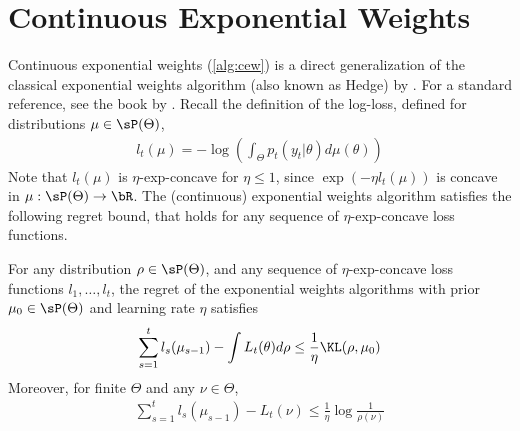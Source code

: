  
\section{Continuous Exponential Weights}\label{sec:cew}

Continuous exponential weights (\cref{alg:cew}) is a direct generalization of the classical exponential weights algorithm (also known as Hedge) by \cite{freund1997decision,littlestone1994weighted}. For a standard reference, see the book by \cite{cesa2006prediction}. Recall the definition of the log-loss, defined for distributions $\mu \in \sP(\Theta)$,
\begin{align*}
 l_t(\mu) = - \log \left(\int_{\Theta} p_t(y_t|\theta)d\mu(\theta)\right)
\end{align*}
Note that $l_t(\mu)$ is $\eta$-exp-concave for $\eta \leq 1$, since $\exp(-\eta l_t(\mu))$ is concave in $\mu : \sP(\Theta) \rightarrow \bR$. The (continuous) exponential weights algorithm satisfies the following regret bound, that holds for any sequence of $\eta$-exp-concave loss functions.
\begin{theorem}\label{thm:cew}
    For any distribution $\rho \in \sP(\Theta)$, and any sequence of $\eta$-exp-concave loss functions $l_1, \dots, l_t$, the regret of the exponential weights algorithms with prior $\mu_0 \in \sP(\Theta)$ and learning rate $\eta$ satisfies
    \begin{align*}
        \sum_{s=1}^t l_s(\mu_{s-1}) - \int L_t(\theta) d\rho \leq \frac{1}{\eta}\KL(\rho, \mu_0)
    \end{align*}
    Moreover, for finite $\Theta$ and any $\nu \in \Theta$,
    \begin{align*}
        \sum_{s=1}^t  l_s(\mu_{s-1}) -  L_t(\nu) \leq \frac{1}{\eta}\log \frac{1}{\rho(\nu)}
    \end{align*}
\end{theorem}


